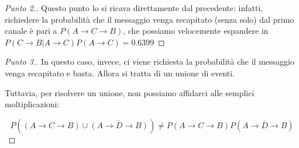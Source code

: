 \documentclass{beamer}
\begin{document}
\begin{frame}
	\begin{proof}[Punto 2.]
		Questo punto lo si ricava direttamente dal precedente: infatti, richiedere la probabilità che il messaggio venga recapitato (senza solo) dal primo canale è pari a $P(A \rightarrow C \rightarrow B)$, che possiamo velocemente espandere in $P(C \rightarrow B|A \rightarrow C)P(A \rightarrow C) = 0.6399$ \qedhere
	\end{proof}
\end{frame}


\begin{frame}
	\begin{proof}[Punto 3.]\renewcommand{\qedsymbol}{$\longrightarrow$}
		In questo caso, invece, ci viene richiesta la probabilità che il messaggio venga recapitato e basta. Allora si tratta di un unione di eventi.

		Tuttavia, per risolvere un unione, non possiamo affidarci alle semplici moltiplicazioni:

		\[
			P((A \rightarrow C \rightarrow B) \cup \overline{(A \rightarrow D \rightarrow B)}) \ne P(A \rightarrow C \rightarrow B)P(\overline{A \rightarrow D \rightarrow B})
		\] \qedhere
	\end{proof}
\end{frame}
\end{document}

